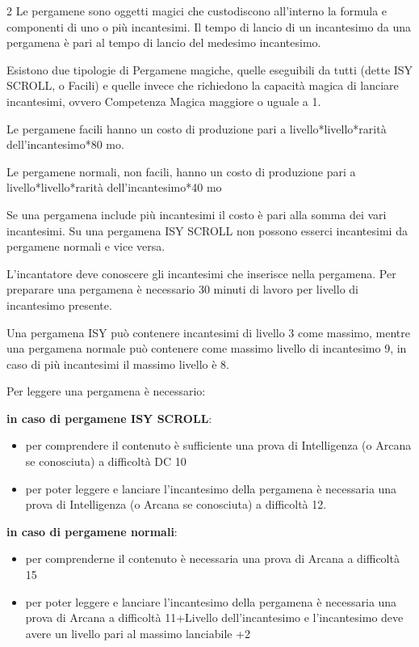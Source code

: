 \begin{multicols}{2}
Le pergamene sono oggetti magici che custodiscono all'interno la formula e componenti di uno o più incantesimi. Il tempo di lancio di un incantesimo da una pergamena è pari al tempo di lancio del medesimo incantesimo.

Esistono due tipologie di Pergamene magiche, quelle eseguibili da tutti (dette ISY SCROLL, o Facili) e quelle invece che richiedono la capacità magica di lanciare incantesimi, ovvero Competenza Magica maggiore o uguale a 1.

Le pergamene facili hanno un costo di produzione pari a livello*livello*rarità dell'incantesimo*80 mo.

Le pergamene normali, non facili, hanno un costo di produzione pari a livello*livello*rarità dell'incantesimo*40 mo

Se una pergamena include più incantesimi il costo è pari alla somma dei vari incantesimi. Su una pergamena ISY SCROLL non possono esserci incantesimi da pergamene normali e vice versa.

L'incantatore deve conoscere gli incantesimi che inserisce nella pergamena. Per preparare una pergamena è necessario 30 minuti di lavoro per livello di incantesimo presente.

Una pergamena ISY può contenere incantesimi di livello 3 come massimo, mentre una pergamena normale può contenere come massimo livello di incantesimo 9, in caso di più incantesimi il massimo livello è 8.

\medskip

Per leggere una pergamena è necessario:\label{leggerepergamena}

\medskip

\textbf{in caso di pergamene ISY SCROLL}:

\begin{itemize}[leftmargin=*] \setlength{\itemsep}{0pt}
\item per comprendere il contenuto è sufficiente una prova di Intelligenza (o Arcana se conosciuta) a difficoltà DC 10
\item per poter leggere e lanciare l'incantesimo della pergamena è necessaria una prova di Intelligenza (o Arcana se conosciuta) a difficoltà 12.
\end{itemize}

\textbf{in caso di pergamene normali}:

\begin{itemize}[leftmargin=*] \setlength{\itemsep}{0pt}
\item per comprenderne il contenuto è necessaria una prova di Arcana a difficoltà 15
\item per poter leggere e lanciare l'incantesimo della pergamena è necessaria una prova di Arcana a difficoltà 11+Livello dell'incantesimo e l'incantesimo deve avere un livello pari al massimo lanciabile +2
\end{itemize}


\end{multicols}
